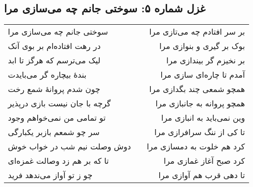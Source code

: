\begin{center}
\section*{غزل شماره ۵: سوختی جانم چه می‌سازی مرا}
\label{sec:005}
\begin{longtable}{l p{0.5cm} r}
سوختی جانم چه می‌سازی مرا
&&
بر سر افتادم چه می‌تازی مرا
\\
در رهت افتاده‌ام بر بوی آنک
&&
بوک بر گیری و بنوازی مرا
\\
لیک می‌ترسم که هرگز تا ابد
&&
بر نخیزم گر بیندازی مرا
\\
بندهٔ بیچاره گر می‌بایدت
&&
آمدم تا چاره‌ای سازی مرا
\\
چون شدم پروانهٔ شمع رخت
&&
همچو شمعی چند بگدازی مرا
\\
گرچه با جان نیست بازی درپذیر
&&
همچو پروانه به جانبازی مرا
\\
تو تمامی من نمی‌خواهم وجود
&&
وین نمی‌باید به انبازی مرا
\\
سر چو شمعم بازبر یکبارگی
&&
تا کی از ننگ سرافرازی مرا
\\
دوش وصلت نیم شب در خواب خوش
&&
کرد هم خلوت به دمسازی مرا
\\
تا که بر هم زد وصالت غمزه‌ای
&&
کرد صبح آغاز غمازی مرا
\\
چو ز تو آواز می‌ندهد فرید
&&
تا دهی قرب هم آوازی مرا
\\
\end{longtable}
\end{center}
